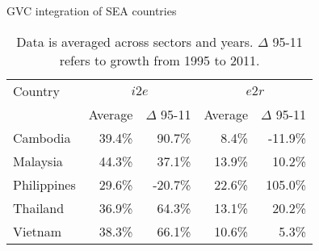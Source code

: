 \documentclass[11pt,a4paper]{article}
\begin{document}
\begin{table}[!h]\small
  \centering
  \caption{GVC integration of SEA countries}
    \begin{tabular}{lrrrr}
    \toprule
    Country & \multicolumn{2}{c}{\multirow{1}[0]{*}{$i2e$}} & \multicolumn{2}{c}{\multirow{1}[0]{*}{$e2r$}} \\
    \multicolumn{1}{c}{} & \multicolumn{1}{c}{Average} & \multicolumn{1}{c}{$\Delta$ 95-11} & \multicolumn{1}{c}{Average} & \multicolumn{1}{c}{$\Delta$ 95-11} \\
    \midrule
    Cambodia & 39.4\% & 90.7\% & 8.4\% & -11.9\% \\
    Malaysia & 44.3\% & 37.1\% & 13.9\% & 10.2\% \\
    Philippines & 29.6\% & -20.7\% & 22.6\% & 105.0\% \\
    Thailand & 36.9\% & 64.3\% & 13.1\% & 20.2\% \\
    Vietnam & 38.3\% & 66.1\% & 10.6\% & 5.3\% \\
    \bottomrule
    \end{tabular}
  \label{tab:seagvc}
  \caption*{Data is averaged across sectors and years. $\Delta$ 95-11 refers to growth from 1995 to 2011.}
\end{table}
\end{document}
